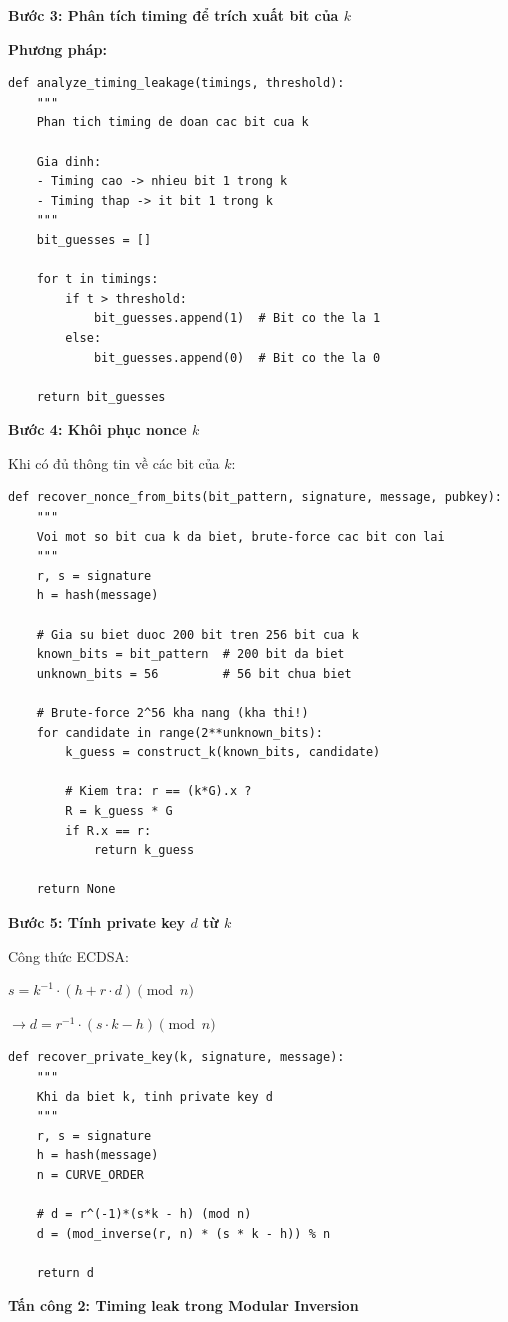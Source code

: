 \textbf{Bước 3: Phân tích timing để trích xuất bit của $k$}

\textbf{Phương pháp:}

\begin{verbatim}
def analyze_timing_leakage(timings, threshold):
    """
    Phan tich timing de doan cac bit cua k
    
    Gia dinh:
    - Timing cao -> nhieu bit 1 trong k
    - Timing thap -> it bit 1 trong k
    """
    bit_guesses = []
    
    for t in timings:
        if t > threshold:
            bit_guesses.append(1)  # Bit co the la 1
        else:
            bit_guesses.append(0)  # Bit co the la 0
    
    return bit_guesses
\end{verbatim}

\textbf{Bước 4: Khôi phục nonce $k$}

Khi có đủ thông tin về các bit của $k$:

\begin{verbatim}
def recover_nonce_from_bits(bit_pattern, signature, message, pubkey):
    """
    Voi mot so bit cua k da biet, brute-force cac bit con lai
    """
    r, s = signature
    h = hash(message)
    
    # Gia su biet duoc 200 bit tren 256 bit cua k
    known_bits = bit_pattern  # 200 bit da biet
    unknown_bits = 56         # 56 bit chua biet
    
    # Brute-force 2^56 kha nang (kha thi!)
    for candidate in range(2**unknown_bits):
        k_guess = construct_k(known_bits, candidate)
        
        # Kiem tra: r == (k*G).x ?
        R = k_guess * G
        if R.x == r:
            return k_guess
    
    return None
\end{verbatim}

\textbf{Bước 5: Tính private key $d$ từ $k$}

Công thức ECDSA:

$s = k^{-1} \cdot (h + r \cdot d) \pmod{n}$

$\rightarrow d = r^{-1} \cdot (s \cdot k - h) \pmod{n}$

\begin{verbatim}
def recover_private_key(k, signature, message):
    """
    Khi da biet k, tinh private key d
    """
    r, s = signature
    h = hash(message)
    n = CURVE_ORDER
    
    # d = r^(-1)*(s*k - h) (mod n)
    d = (mod_inverse(r, n) * (s * k - h)) % n
    
    return d
\end{verbatim}\textbf{Tấn công 2: Timing leak trong Modular Inversion}


